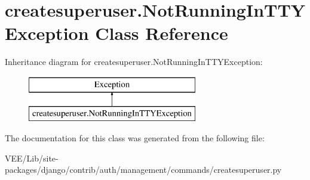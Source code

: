 \hypertarget{classcreatesuperuser_1_1_not_running_in_t_t_y_exception}{}\section{createsuperuser.\+Not\+Running\+In\+T\+T\+Y\+Exception Class Reference}
\label{classcreatesuperuser_1_1_not_running_in_t_t_y_exception}
Inheritance diagram for createsuperuser.\+Not\+Running\+In\+T\+T\+Y\+Exception\+:\begin{figure}[H]
\begin{center}
\leavevmode
\includegraphics[height=2.000000cm]{classcreatesuperuser_1_1_not_running_in_t_t_y_exception}
\end{center}
\end{figure}


The documentation for this class was generated from the following file\+:\begin{DoxyCompactItemize}
\item 
V\+E\+E/\+Lib/site-\/packages/django/contrib/auth/management/commands/createsuperuser.\+py\end{DoxyCompactItemize}
